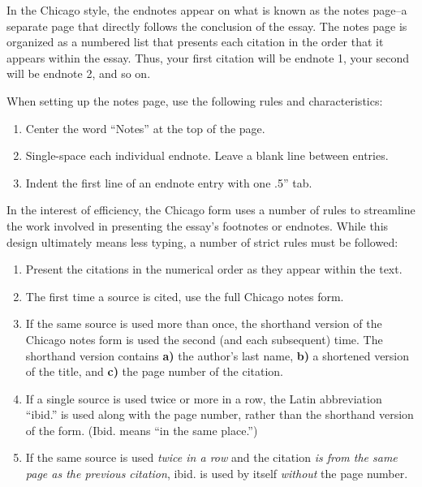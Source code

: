 In the Chicago style, the endnotes appear on what is known as the notes page--a separate page that directly follows the conclusion of the essay. The notes page is organized as a numbered list that presents each citation in the order that it appears within the essay. Thus, your first citation will be endnote 1, your second will be endnote 2, and so on.

When setting up the notes page, use the following rules and characteristics:

\begin{enumerate}
\item Center the word ``Notes'' at the top of the page.
\item Single-space each individual endnote. Leave a blank line between entries.
\item Indent the first line of an endnote entry with one .5'' tab.
\end{enumerate}

In the interest of efficiency, the Chicago form uses a number of rules to streamline the work involved in presenting the essay's footnotes or endnotes. While this design ultimately means less typing, a number of strict rules must be followed:

\begin{enumerate}
\item Present the citations in the numerical order as they appear within the text.

\item The first time a source is cited, use the full Chicago notes form.

\item If the same source is used more than once, the shorthand version of the Chicago notes form is used the second (and each subsequent) time. The shorthand version contains \textbf{a)} the author's last name, \textbf{b)} a shortened version of the title, and \textbf{c)} the page number of the citation.

\item If a single source is used twice or more in a row, the Latin abbreviation ``ibid.'' is used along with the page number, rather than the shorthand version of the form. (Ibid. means ``in the same place.'')

\item If the same source is used \emph{twice in a row} and the citation \emph{is from the same page as the previous citation}, ibid. is used by itself \emph{without} the page number. 
\end{enumerate}

